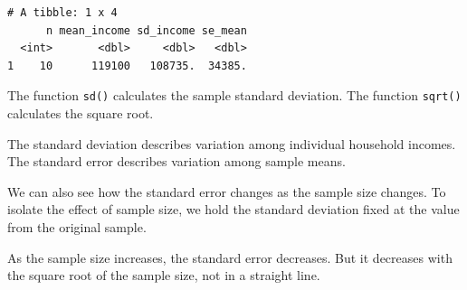 \documentclass[
  letterpaper,
  DIV=11,
  numbers=noendperiod]{scrreprt}
\begin{document}
\begin{verbatim}
# A tibble: 1 x 4
      n mean_income sd_income se_mean
  <int>       <dbl>     <dbl>   <dbl>
1    10      119100   108735.  34385.
\end{verbatim}

The function \texttt{sd()} calculates the sample standard deviation. The
function \texttt{sqrt()} calculates the square root.

The standard deviation describes variation among individual household
incomes. The standard error describes variation among sample means.

We can also see how the standard error changes as the sample size
changes. To isolate the effect of sample size, we hold the standard
deviation fixed at the value from the original sample.

\begin{table}

\caption{\label{tbl-r-standard-error-sample-size}Estimated standard
error for different sample sizes}


\end{table}%

As the sample size increases, the standard error decreases. But it
decreases with the square root of the sample size, not in a straight
line.
\end{document}

